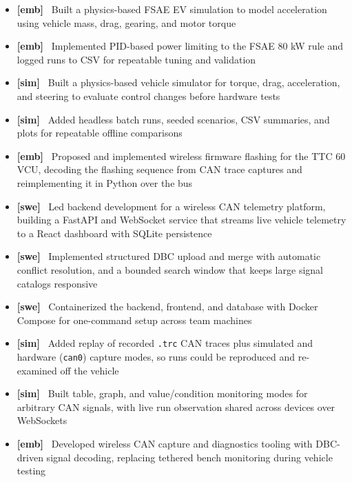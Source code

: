 \documentclass[10pt,letterpaper]{article}
\newcommand{\vtag}[1]{\textbf{[#1]}~}
\begin{document}
\entryspace

\orgline{\spartanracing}
\begin{itemize}
  \item \vtag{emb} Built a physics-based FSAE EV simulation to model acceleration using vehicle mass, drag, gearing, and motor torque
  \item \vtag{emb} Implemented PID-based power limiting to the FSAE 80 kW rule and logged runs to CSV for repeatable tuning and validation
  \item \vtag{sim} Built a physics-based vehicle simulator for torque, drag, acceleration, and steering to evaluate control changes before hardware tests
  \item \vtag{sim} Added headless batch runs, seeded scenarios, CSV summaries, and plots for repeatable offline comparisons
\end{itemize}

\entryspace

\begin{itemize}
  \item \vtag{emb} Proposed and implemented wireless firmware flashing for the TTC 60 VCU, decoding the flashing sequence from CAN trace captures and reimplementing it in Python over the bus
  \item \vtag{swe} Led backend development for a wireless CAN telemetry platform, building a FastAPI and WebSocket service that streams live vehicle telemetry to a React dashboard with SQLite persistence
  \item \vtag{swe} Implemented structured DBC upload and merge with automatic conflict resolution, and a bounded search window that keeps large signal catalogs responsive
  \item \vtag{swe} Containerized the backend, frontend, and database with Docker Compose for one-command setup across team machines
  \item \vtag{sim} Added replay of recorded \texttt{.trc} CAN traces plus simulated and hardware (\texttt{can0}) capture modes, so runs could be reproduced and re-examined off the vehicle
  \item \vtag{sim} Built table, graph, and value/condition monitoring modes for arbitrary CAN signals, with live run observation shared across devices over WebSockets
  \item \vtag{emb} Developed wireless CAN capture and diagnostics tooling with DBC-driven signal decoding, replacing tethered bench monitoring during vehicle testing
\end{itemize}
\end{document}
